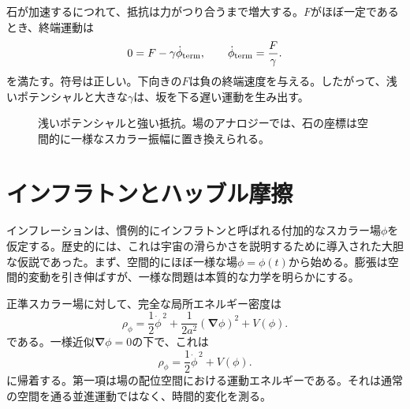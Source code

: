 \begin{classroomqa}
\end{classroomqa}

石が加速するにつれて、抵抗は力がつり合うまで増大する。\(F\)がほぼ一定であるとき、終端運動は
\begin{equation}
0=F-\gamma\dot\phi_{\rm term},
\qquad
\dot\phi_{\rm term}=\frac{F}{\gamma}.
\end{equation}
を満たす。符号は正しい。下向きの\(F\)は負の終端速度を与える。したがって、浅いポテンシャルと大きな\(\gamma\)は、坂を下る遅い運動を生み出す。

\begin{figure}[htbp]
\centering
{}
\caption{浅いポテンシャルと強い抵抗。場のアナロジーでは、石の座標は空間的に一様なスカラー振幅に置き換えられる。}
\label{fig:c08-shallow-potential}
\end{figure}

\section{インフラトンとハッブル摩擦}

インフレーションは、慣例的にインフラトンと呼ばれる付加的なスカラー場\(\phi\)を仮定する。歴史的には、これは宇宙の滑らかさを説明するために導入された大胆な仮説であった。まず、空間的にほぼ一様な場\(\phi=\phi(t)\)から始める。膨張は空間的変動を引き伸ばすが、一様な問題は本質的な力学を明らかにする。

正準スカラー場に対して、完全な局所エネルギー密度は
\begin{equation}
\rho_\phi
=
\frac12\dot\phi^{\,2}
+\frac{1}{2a^2}(\boldsymbol\nabla\phi)^2
+V(\phi).
\end{equation}
である。一様近似\(\boldsymbol\nabla\phi=0\)の下で、これは
\begin{equation}
\rho_\phi=\frac12\dot\phi^{\,2}+V(\phi).
\label{eq:c08-scalar-density}
\end{equation}
に帰着する。第一項は場の配位空間における運動エネルギーである。それは通常の空間を通る並進運動ではなく、時間的変化を測る。

